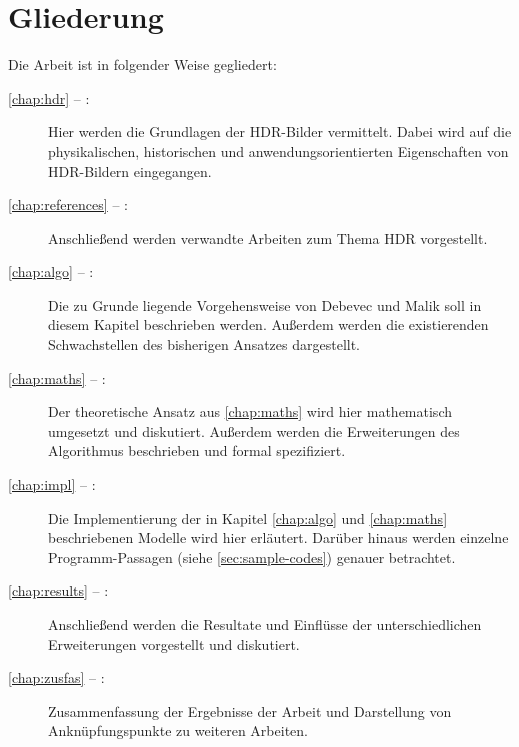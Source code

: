 \section{Gliederung}
Die Arbeit ist in folgender Weise gegliedert:
\begin{description}

\item[\autoref{chap:hdr} -- :] Hier werden die Grundlagen der \gls{HDR}-Bilder vermittelt. Dabei wird auf die physikalischen, historischen und anwendungsorientierten Eigenschaften von \gls{HDR}-Bildern eingegangen.

\item[\autoref{chap:references} -- :] Anschließend werden verwandte Arbeiten zum Thema \gls{HDR} vorgestellt.

\item[\autoref{chap:algo} -- :] Die zu Grunde liegende Vorgehensweise von Debevec und Malik \cite{paper} soll in diesem Kapitel beschrieben werden. Außerdem werden die existierenden Schwachstellen des bisherigen Ansatzes dargestellt.

\item[\autoref{chap:maths} -- :] Der theoretische Ansatz aus \autoref{chap:maths} wird hier mathematisch umgesetzt und diskutiert. Außerdem werden die Erweiterungen des Algorithmus beschrieben und formal spezifiziert.

\item[\autoref{chap:impl} -- :] Die Implementierung der in Kapitel \autoref{chap:algo} und \autoref{chap:maths} beschriebenen Modelle wird hier erläutert. Darüber hinaus werden einzelne Programm-Passagen (siehe \autoref{sec:sample-codes}) genauer betrachtet.

\item[\autoref{chap:results} -- :] Anschließend werden die Resultate und Einflüsse der unterschiedlichen Erweiterungen vorgestellt und diskutiert.

\item[\autoref{chap:zusfas} -- :] Zusammenfassung der Ergebnisse der Arbeit und Darstellung von Anknüpfungspunkte zu weiteren Arbeiten.
\end{description}
